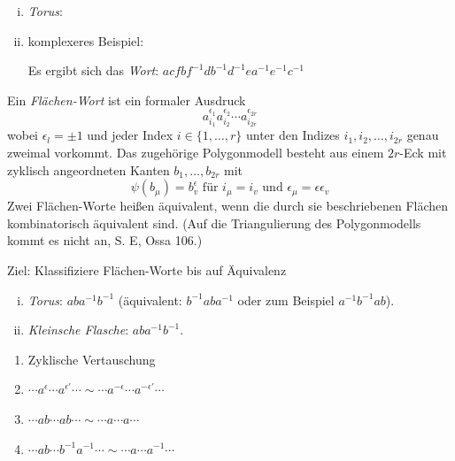 \documentclass[a4paper,10pt]{scrartcl}
\begin{document}
\begin{exs*}
 \begin{enumerate}[(i)]
  \item \emph{Torus}:
\begin{figure}[H]
 \centering
\fixme[fig136]
\caption{}
\end{figure}
\item komplexeres Beispiel:
\begin{figure}[H]
 \centering
\fixme[fig137]
\caption{}
\end{figure}
Es ergibt sich das \emph{Wort}: $acfbf^{-1}db^{-1}d^{-1}ea^{-1}e^{-1}c^{-1}$
 \end{enumerate}
\end{exs*}
\begin{df}
 Ein \emph{Flächen-Wort} ist ein formaler Ausdruck
\[
 a_{i_1}^{\epsilon_1} a_{i_2}^{\epsilon_2} \dotsb a_{i_{2r}}^{\epsilon_{2r}}
\]
wobei $\epsilon_l=\pm 1$ und jeder Index $i\in \{1,\dotsc, r\}$ unter den Indizes $i_1, i_2, \dotsc , i_{2r}$ genau zweimal vorkommt. Das zugehörige Polygonmodell besteht aus einem $2r$-Eck mit zyklisch angeordneten Kanten $b_1,\dotsc , b_{2r}$ mit
\[
 \psi(b_\mu)=b_v^\epsilon \text{ für } i_\mu=i_v \text{ und } \epsilon_\mu=\epsilon \epsilon_v
\]
Zwei Flächen-Worte heißen äquivalent, wenn die durch sie beschriebenen Flächen kombinatorisch äquivalent sind.
(Auf die Triangulierung des Polygonmodells kommt es nicht an, S. E, Ossa 106.)
\end{df}
\begin{seg}{Ziel:}
 Klassifiziere Flächen-Worte bis auf Äquivalenz
\end{seg}
\begin{exs*}
\begin{enumerate}[(i)]
 \item \emph{Torus}: $aba^{-1}b^{-1}$ (äquivalent: $b^{-1}aba^{-1}$ oder zum Beispiel $a^{-1} b^{-1} a b$).
 \item \emph{Kleinsche Flasche}: $aba^{-1}b^{-1}$.
\begin{figure}[H]
 \centering
\fixme[fig138]
\caption{}
\end{figure}
\end{enumerate}
\end{exs*}
\begin{lem}
\begin{enumerate}
 \item Zyklische Vertauschung
 \item $\dotsb a^{\epsilon}\dotsb a^{\epsilon'}\dotsb \sim \dotsb a^{-\epsilon}\dotsb a^{-\epsilon'}\dotsb$
 \item $\dotsb ab\dotsb ab\dotsb \sim \dotsb a \dotsb a\dotsb$
 \item $\dotsb ab\dotsb b^{-1} a^{-1}\dotsb \sim \dotsb a \dotsb a^{-1} \dotsb$
\setcounter{figure}{139}
\begin{figure}[H]
 \centering
\fixme[fig140]
\caption{}
\end{figure}

\end{enumerate}
\end{lem}
\end{document}
